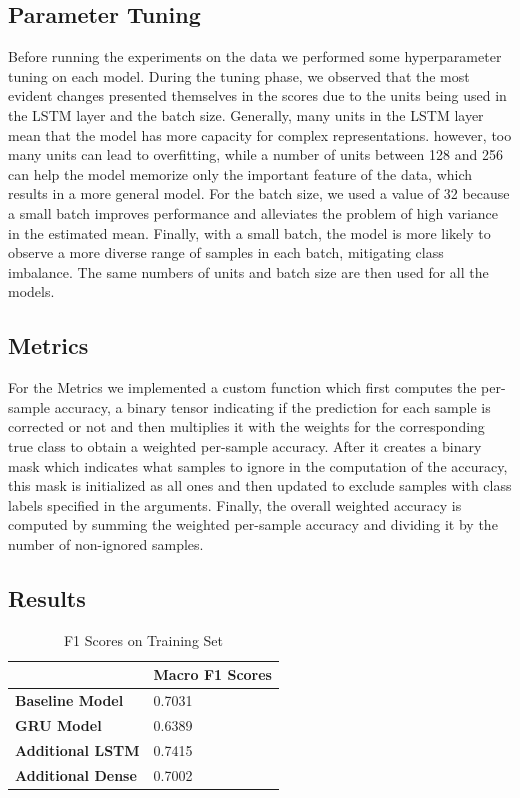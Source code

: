 \documentclass[11pt]{article}
\begin{document}
\subsection{Parameter Tuning}
Before running the experiments on the data we performed some hyperparameter tuning on each model.
During the tuning phase, we observed that the most evident changes presented themselves in the scores due to the units being used in the LSTM layer and the batch size. Generally, many units in the LSTM layer mean that the model has more capacity for complex representations. however, too many units can lead to overfitting, while a number of units between 128 and 256 can help the model memorize only the important feature of the data, which results in a more general model.
For the batch size, we used a value of 32 because a small batch improves performance and alleviates the problem of high variance in the estimated mean. Finally, with a small batch, the model is more likely to observe a more diverse range of samples in each batch, mitigating class imbalance.
The same numbers of units and batch size are then used for all the models.
\subsection{Metrics}
For the Metrics we implemented a custom function which first computes the per-sample accuracy, a binary tensor indicating if the prediction for each sample is corrected or not and then multiplies it with the weights for the corresponding true class to obtain a weighted per-sample accuracy.
After it creates a binary mask which indicates what samples to ignore in the computation of the accuracy, this mask is initialized as all ones and then updated to exclude samples with class labels specified in the arguments.
Finally, the overall weighted accuracy is computed by summing the weighted per-sample accuracy and dividing it by the number of non-ignored samples.
\subsection{Results}

\begin{table}[ht]
\caption{F1 Scores on Training Set}
\begin{tabular}{|l|l|}
\hline
                                             & \textbf{Macro F1 Scores} \\ \hline
\textbf{Baseline Model}                      & 0.7031                   \\ \hline
\textbf{GRU Model}                           & 0.6389                   \\ \hline
\textbf{Additional LSTM}                     & 0.7415                   \\ \hline
\textbf{Additional Dense}                    & 0.7002                   \\ \hline
\end{tabular}
\label{Tab:Tcr_1}
\end{table}
\end{document}
